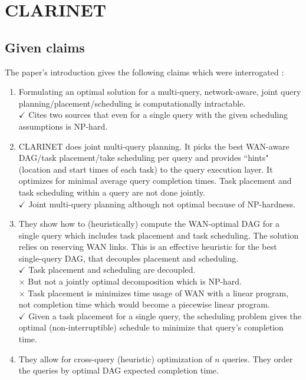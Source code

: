 \section{CLARINET}

\subsection{Given claims}

The paper's introduction gives the following claims which were interrogated \cite{viswanathan2016clarinet}:

\begin{enumerate}
	\item Formulating an optimal solution for a multi-query, network-aware, joint query planning/placement/scheduling is computationally intractable. \\
	$\checkmark$ Cites two sources that even for a single query with the given scheduling assumptions is NP-hard.
	\item CLARINET does joint multi-query planning.
	It picks the best WAN-aware DAG/task placement/take scheduling per query and provides ``hints" (location and start times of each task) to the query execution layer.
	It optimizes for minimal average query completion times.
	Task placement and task scheduling within a query are not done jointly.\\
	$\checkmark$ Joint multi-query planning although not optimal because of NP-hardness.
	\item They show how to (heuristically) compute the WAN-optimal DAG for a single query which includes task placement and task scheduling.
	The solution relies on reserving WAN links.
	This is an effective heuristic for the best single-query DAG, that decouples placement and scheduling.\\
	$\checkmark$ Task placement and scheduling are decoupled.\\ 
	$\times$ But not a jointly optimal decomposition which is NP-hard. \\
	$\times$ Task placement is minimizes time usage of WAN with a linear program, not completion time which would become a piecewise linear program. \\
	$\checkmark$ Given a task placement for a single query, the scheduling problem gives the optimal (non-interruptible) schedule to minimize that query's completion time.
	\item They allow for cross-query (heuristic) optimization of $n$ queries.
	They order the queries by optimal DAG expected completion time.

\end{enumerate}
